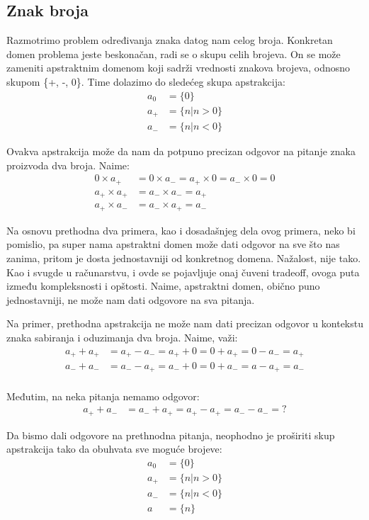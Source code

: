 \documentclass[a4paper]{article}
\begin{document}
\subsection{Znak broja}

Razmotrimo problem određivanja znaka datog nam celog broja. \cite{mvj}
Konkretan domen problema jeste beskonačan, radi se o skupu celih brojeva. On se može zameniti apstraktnim domenom koji sadrži vrednosti znakova brojeva, odnosno skupom \{+, -, 0\}. Time dolazimo do sledećeg skupa apstrakcija: 
\begin{align*}
    a_0 &= \{0\} \\
    a_+ &= \{n|n>0\} \\
    a_- &= \{n|n<0\}
\end{align*}

Ovakva apstrakcija može da nam da potpuno precizan odgovor na pitanje znaka proizvoda dva broja. Naime:
\begin{align*}
    0 \times a_+ &= 0 \times a_- = a_+ \times 0 = a_- \times 0 = 0 \\
    a_+ \times a_+ &= a_- \times a_- = a_+ \\
    a_+ \times a_- &= a_- \times a_+ = a_-
\end{align*}

Na osnovu prethodna dva primera, kao i dosadašnjeg dela ovog primera, neko bi pomislio, pa super nama apstraktni domen može dati odgovor na sve što nas zanima, pritom je dosta jednostavniji od konkretnog domena. Nažalost, nije tako. Kao i svugde u računarstvu, i ovde se pojavljuje onaj čuveni tradeoff, ovoga puta između kompleksnosti i opštosti. Naime, apstraktni domen, obično puno jednostavniji, ne može nam dati odgovore na sva pitanja. \newline

Na primer, prethodna apstrakcija ne može nam dati precizan odgovor u kontekstu znaka sabiranja i oduzimanja dva broja. Naime, važi:
\begin{align*}
    a_+ + a_+ &= a_+ - a_- = a_+ + 0 = 0 + a_+ = 0 - a_- = a_+ \\
    a_- + a_- &= a_- - a_+ = a_- + 0 = 0 + a_- = a - a_+ = a_- \\
\end{align*}

Međutim, na neka pitanja nemamo odgovor:
\begin{align*}
    a_+ + a_- &= a_- + a_+ = a_+ - a_+ = a_- - a_- = ?
\end{align*}

Da bismo dali odgovore na prethnodna pitanja, neophodno je proširiti skup apstrakcija tako da obuhvata sve moguće brojeve:
\begin{align*}
    a_0 &= \{0\} \\
    a_+ &= \{n|n>0\} \\
    a_- &= \{n|n<0\} \\ 
    a &= \{n\} 
\end{align*}
\end{document}
